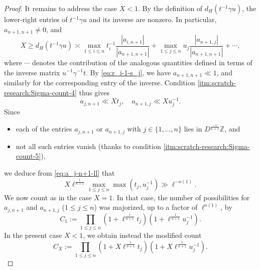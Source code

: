 \begin{proof}
  It remains to address the case $X < 1$.  By the definition of $d_H(t^{-1} \gamma u)$, the lower-right entries of $t^{-1} \gamma u$ and its inverse are nonzero.  In particular, $a_{n+1,n+1} \neq 0$, and
  \begin{equation}\label{eq:d_hr-1-gamma}
    X \geq d_H(t^{-1} \gamma u) \asymp
    \max_{1 \leq i \leq n}
    t_i^{-1} \frac{|a_{i,n+1}|}{ | a_{n+1, n+1}|}
    +
    \max_{1 \leq j \leq n}
    u_j \frac{|a_{n+1, j}|}{ | a_{n+1, n+1}|}
    + \dotsb,
  \end{equation}
  where $\dotsb$ denotes the contribution of the analogous quantities defined in terms of the inverse matrix $u^{-1} \gamma^{-1} t$.  By \eqref{eq:r_i-1-s_j}, we have $a_{n+1,n+1} \ll 1$, and similarly for the corresponding entry of the inverse.  Condition \eqref{itm:scratch-research:Sigma-count-4} thus gives
  \begin{equation}\label{eq:a_j-n+1-ll}
    a_{j,n+1} \ll X t_j, \quad
    a_{n+1,j} \ll X u_j^{-1}.
  \end{equation}
  Since
  \begin{itemize}
  \item each of the entries $a_{j,n+1}$ or $a_{n+1,j}$ with $j \in \{1,\dotsc,n\}$ lies in $D^{\frac{-1}{n+1}} \mathbb{Z}$, and
  \item not all such entries vanish (thanks to condition \eqref{itm:scratch-research:Sigma-count-5}),
  \end{itemize}
  we deduce from \eqref{eq:a_j-n+1-ll} that
  \begin{equation}\label{eq:x-max_1-leq}
    X \ell^{\frac{1}{n+1}} \max_{1 \leq j \leq n} \max(t_j, u_j^{-1}) \gg \ell^{ - o(1)}.
  \end{equation}
  We now count as in the case $X = 1$.  In that case, the number of possibilities for $a_{j,n+1}$ and $a_{n+1,j}$ ($1 \leq j \leq n$) was majorized, up to a factor of $\ell^{o(1)}$, by
  \begin{equation*}
    C_1 := \prod_{1 \leq j \leq n } (1 + \ell^{\frac{1}{n+1}} t_j)  (1 + \ell^{\frac{1}{n+1}} u_j^{-1}).
  \end{equation*}
  In the present case $X < 1$, we obtain instead the modified count
  \begin{equation}\label{eq:c_x-:=-prod_1}
    C_X := \prod_{1 \leq j \leq n } (1 + X \ell^{\frac{1}{n+1}} t_j)  (1 + X \ell^{\frac{1}{n+1}} u_j^{-1}).
  \end{equation}


\end{proof}
